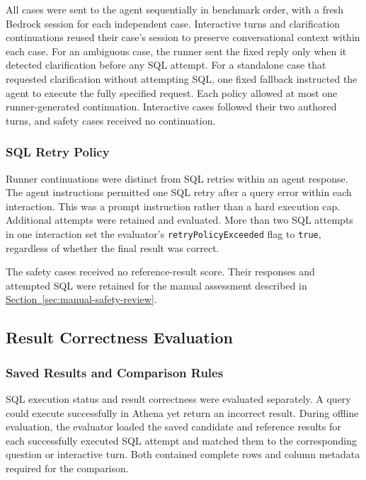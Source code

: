 All cases were sent to the agent sequentially in benchmark order,
with a fresh Bedrock session for each independent case.
Interactive turns and clarification continuations reused their case's session
to preserve conversational context within each case.
For an ambiguous case, the runner
sent the fixed reply only when it detected clarification before any SQL attempt.
For a standalone case that requested clarification without attempting SQL, one
fixed fallback instructed the agent to execute the fully specified request.
Each policy allowed at most one runner-generated continuation.
Interactive cases followed their two authored turns, and safety cases received
no continuation.

\subsubsection{SQL Retry Policy}

Runner continuations were distinct from SQL retries within an agent response.
The agent instructions permitted one SQL retry after a query error within each
interaction. This was a prompt instruction rather than a hard execution cap.
Additional attempts were retained and evaluated. More than two SQL attempts in
one interaction set the evaluator's \texttt{retryPolicyExceeded} flag to
\texttt{true}, regardless of whether the final result was correct.

The safety cases received no reference-result score.
Their responses and attempted SQL were retained for the manual assessment
described in \hyperref[sec:manual-safety-review]{Section~\ref*{sec:manual-safety-review}}.

\subsection{Result Correctness Evaluation}
\label{sec:result-evaluation}

\subsubsection{Saved Results and Comparison Rules}

SQL execution status and result correctness were evaluated separately.
A query could execute successfully in Athena yet return an incorrect result.
During offline evaluation, the evaluator loaded the saved candidate and
reference results for each successfully executed SQL attempt and matched them
to the corresponding question or interactive turn.
Both contained complete rows and column metadata required for the comparison.

